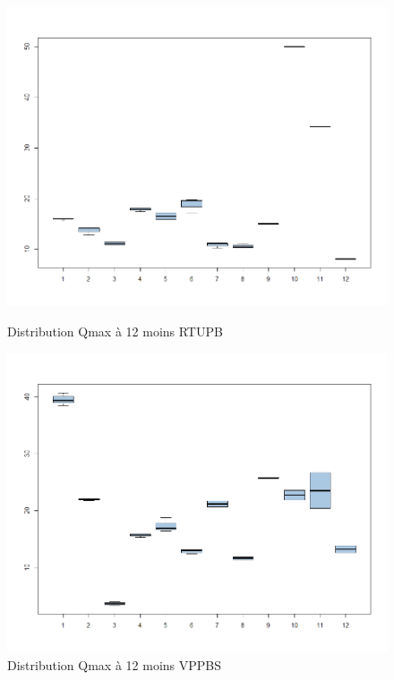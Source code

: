 %
%

\begin{figure}[h]
    \begin{minipage}[c]{.46\linewidth}
        \centering
        \includegraphics[width=1\textwidth]{../Fig/RTUPB/rtupb-qmax-k12-distribution.png}
        \caption{Distribution Qmax à 12 moins RTUPB}
    \end{minipage}
    \hfill%
    \begin{minipage}[c]{.46\linewidth}
        \centering
        \includegraphics[width=1\textwidth]{../Fig/VPPBS/vppbs-qmax-k12-distribution.png}
        \caption{Distribution Qmax à 12 moins VPPBS}
    \end{minipage}
\end{figure}

